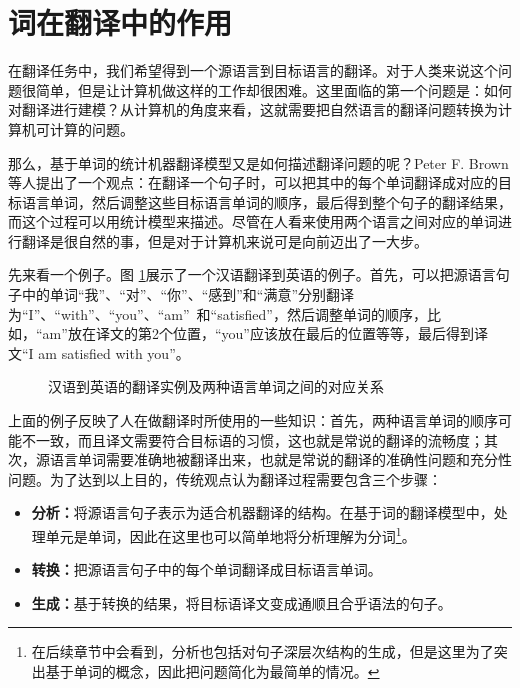 \section{词在翻译中的作用}

\parinterval 在翻译任务中，我们希望得到一个源语言到目标语言的翻译。对于人类来说这个问题很简单，但是让计算机做这样的工作却很困难。这里面临的第一个问题是：如何对翻译进行建模？从计算机的角度来看，这就需要把自然语言的翻译问题转换为计算机可计算的问题。

\parinterval 那么，基于单词的统计机器翻译模型又是如何描述翻译问题的呢？Peter F. Brown等人提出了一个观点：在翻译一个句子时，可以把其中的每个单词翻译成对应的目标语言单词，然后调整这些目标语言单词的顺序，最后得到整个句子的翻译结果，而这个过程可以用统计模型来描述。尽管在人看来使用两个语言之间对应的单词进行翻译是很自然的事，但是对于计算机来说可是向前迈出了一大步。

\parinterval 先来看一个例子。图 \ref{fig:5-1}展示了一个汉语翻译到英语的例子。首先，可以把源语言句子中的单词“我”、“对”、“你”、“感到”和“满意”分别翻译为“I”、“with”、“you”、“am”\ 和“satisfied”，然后调整单词的顺序，比如，“am”放在译文的第2个位置，“you”应该放在最后的位置等等，最后得到译文“I am satisfied with you”。

\begin{figure}[htp]
    \centering

    \caption{汉语到英语的翻译实例及两种语言单词之间的对应关系}
    \label{fig:5-1}
\end{figure}

\parinterval 上面的例子反映了人在做翻译时所使用的一些知识：首先，两种语言单词的顺序可能不一致，而且译文需要符合目标语的习惯，这也就是常说的翻译的流畅度；其次，源语言单词需要准确地被翻译出来，也就是常说的翻译的准确性问题和充分性问题。为了达到以上目的，传统观点认为翻译过程需要包含三个步骤：

\begin{itemize}
\vspace{0.5em}
\item {\small\sffamily\bfseries{分析：}}将源语言句子表示为适合机器翻译的结构。在基于词的翻译模型中，处理单元是单词，因此在这里也可以简单地将分析理解为分词\footnote{在后续章节中会看到，分析也包括对句子深层次结构的生成，但是这里为了突出基于单词的概念，因此把问题简化为最简单的情况。}。
\vspace{0.5em}
\item {\small\sffamily\bfseries{转换：}}把源语言句子中的每个单词翻译成目标语言单词。
\vspace{0.5em}
\item {\small\sffamily\bfseries{生成：}}基于转换的结果，将目标语译文变成通顺且合乎语法的句子。
\vspace{0.5em}
\end{itemize}

